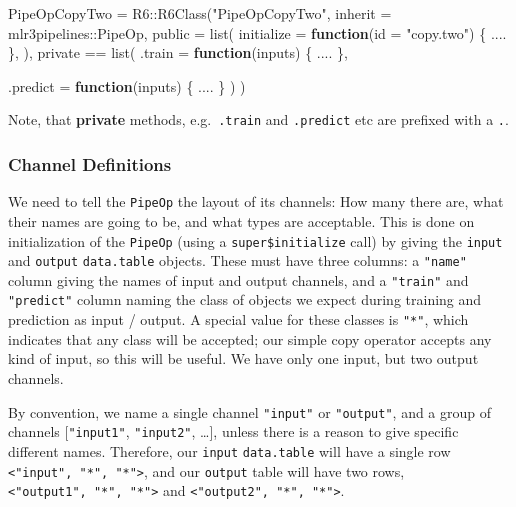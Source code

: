\documentclass[
]{scrbook}
\newenvironment{Shaded}{\begin{snugshade}}{\end{snugshade}}
\newcommand{\AttributeTok}[1]{\textcolor[rgb]{0.77,0.63,0.00}{#1}}
\newcommand{\ControlFlowTok}[1]{\textcolor[rgb]{0.13,0.29,0.53}{\textbf{#1}}}
\newcommand{\FunctionTok}[1]{\textcolor[rgb]{0.00,0.00,0.00}{#1}}
\newcommand{\NormalTok}[1]{#1}
\newcommand{\OtherTok}[1]{\textcolor[rgb]{0.56,0.35,0.01}{#1}}
\newcommand{\SpecialCharTok}[1]{\textcolor[rgb]{0.00,0.00,0.00}{#1}}
\newcommand{\StringTok}[1]{\textcolor[rgb]{0.31,0.60,0.02}{#1}}
\renewenvironment{Shaded} {\begin{snugshade}\small} {\end{snugshade}}
\begin{document}
\begin{Shaded}
\begin{Highlighting}[]
\NormalTok{PipeOpCopyTwo }\OtherTok{=}\NormalTok{ R6}\SpecialCharTok{::}\FunctionTok{R6Class}\NormalTok{(}\StringTok{"PipeOpCopyTwo"}\NormalTok{,}
  \AttributeTok{inherit =}\NormalTok{ mlr3pipelines}\SpecialCharTok{::}\NormalTok{PipeOp,}
  \AttributeTok{public =} \FunctionTok{list}\NormalTok{(}
    \AttributeTok{initialize =} \ControlFlowTok{function}\NormalTok{(}\AttributeTok{id =} \StringTok{"copy.two"}\NormalTok{) \{}
\NormalTok{      ....}
\NormalTok{    \},}
\NormalTok{  ),}
\NormalTok{  private }\SpecialCharTok{==} \FunctionTok{list}\NormalTok{(}
    \AttributeTok{.train =} \ControlFlowTok{function}\NormalTok{(inputs) \{}
\NormalTok{      ....}
\NormalTok{    \},}

    \AttributeTok{.predict =} \ControlFlowTok{function}\NormalTok{(inputs) \{}
\NormalTok{      ....}
\NormalTok{    \}}
\NormalTok{  )}
\NormalTok{)}
\end{Highlighting}
\end{Shaded}

Note, that \textbf{private} methods, e.g.~\texttt{.train} and \texttt{.predict} etc are prefixed with a \texttt{.}.

\hypertarget{channel-definitions}{%
\subsubsection{Channel Definitions}\label{channel-definitions}}

We need to tell the \texttt{PipeOp} the layout of its channels: How many there are, what their names are going to be, and what types are acceptable.
This is done on initialization of the \texttt{PipeOp} (using a \texttt{super\$initialize} call) by giving the \texttt{input} and \texttt{output} \texttt{data.table} objects.
These must have three columns: a \texttt{"name"} column giving the names of input and output channels, and a \texttt{"train"} and \texttt{"predict"} column naming the class of objects we expect during training and prediction as input / output.
A special value for these classes is \texttt{"*"}, which indicates that any class will be accepted; our simple copy operator accepts any kind of input, so this will be useful. We have only one input, but two output channels.

By convention, we name a single channel \texttt{"input"} or \texttt{"output"}, and a group of channels {[}\texttt{"input1"}, \texttt{"input2"}, \ldots{]}, unless there is a reason to give specific different names. Therefore, our \texttt{input} \texttt{data.table} will have a single row \texttt{\textless{}"input",\ "*",\ "*"\textgreater{}}, and our \texttt{output} table will have two rows, \texttt{\textless{}"output1",\ "*",\ "*"\textgreater{}} and \texttt{\textless{}"output2",\ "*",\ "*"\textgreater{}}.
\end{document}
